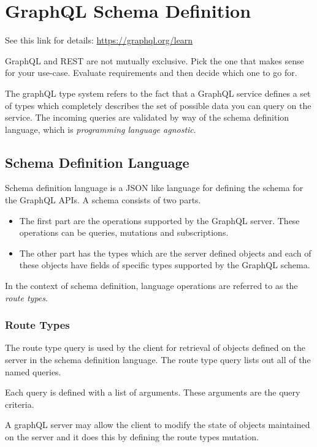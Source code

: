 \documentclass[a4paper, 11pt]{book}
\begin{document}
    \section{GraphQL Schema Definition}
    See this link for details: \href{https://graphql.org/learn}{https://graphql.org/learn}

    GraphQL and REST are not mutually exclusive.
    Pick the one that makes sense for your use-case.
    Evaluate requirements and then decide which one to go for.

    The graphQL type system refers to the fact that a GraphQL service defines a set of types which completely describes the set of possible data you can query on the service.
    The incoming queries are validated by way of the schema definition language, which is \textit{programming language agnostic}.

    \subsection{Schema Definition Language}
    Schema definition language is a JSON like language for defining the schema for the GraphQL APIs.
    A schema consists of two parts.

    \begin{itemize}
        \item The first part are the operations supported by the GraphQL server. These operations can be queries, mutations and subscriptions.
        \item The other part has the types which are the server defined objects and each of these objects have fields of specific types supported by the GraphQL schema.
    \end{itemize}

    In the context of schema definition, language operations are referred to as the \textit{route types}.

    \subsubsection{Route Types}
    The route type query is used by the client for retrieval of objects defined on the server in the schema definition language.
    The route type query lists out all of the named queries.

    Each query is defined with a list of arguments.
    These arguments are the query criteria.

    A graphQL server may allow the client to modify the state of objects maintained on the server and it does this by defining the route types mutation.
\end{document}
